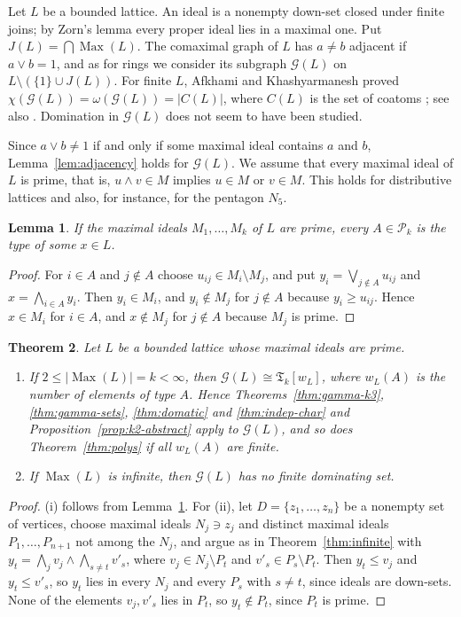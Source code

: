 \documentclass[11pt]{amsart}
\newtheorem{theorem}{Theorem}[section]
\newtheorem{lemma}[theorem]{Lemma}
\theoremstyle{definition}
\theoremstyle{remark}
\newcommand{\Max}{\operatorname{Max}}
\newcommand{\Jac}{J}
\newcommand{\G}{\mathcal{G}}
\newcommand{\TG}{\mathfrak{T}}
\newcommand{\Pk}{\mathcal{P}_k}
\begin{document}
Let $L$ be a bounded lattice. An ideal is a nonempty down-set closed under finite joins; by Zorn's
lemma every proper ideal lies in a maximal one. Put $\Jac(L)=\bigcap\Max(L)$. The comaximal graph of
$L$ \cite{AK14} has $a\neq b$ adjacent if $a\vee b=1$, and as for rings we consider its subgraph
$\G(L)$ on $L\setminus(\{1\}\cup\Jac(L))$. For finite $L$, Afkhami and Khashyarmanesh proved
$\chi(\G(L))=\omega(\G(L))=|C(L)|$, where $C(L)$ is the set of coatoms \cite[Theorem~3.4]{AK14};
see also \cite{AKS15}. Domination in $\G(L)$ does not seem to have been studied.

Since $a\vee b\neq1$ if and only if some maximal ideal contains $a$ and $b$,
Lemma~\ref{lem:adjacency} holds for $\G(L)$. We assume that every maximal ideal of $L$ is prime,
that is, $u\wedge v\in M$ implies $u\in M$ or $v\in M$. This holds for distributive lattices
\cite{Gr11} and also, for instance, for the pentagon $N_5$.

\begin{lemma}\label{lem:lattice-realization}
If the maximal ideals $M_1,\dots,M_k$ of $L$ are prime, every $A\in\Pk$ is the type of some
$x\in L$.
\end{lemma}

\begin{proof}
For $i\in A$ and $j\notin A$ choose $u_{ij}\in M_i\setminus M_j$, and put
$y_i=\bigvee_{j\notin A}u_{ij}$ and $x=\bigwedge_{i\in A}y_i$. Then $y_i\in M_i$, and $y_i\notin M_j$
for $j\notin A$ because $y_i\ge u_{ij}$. Hence $x\in M_i$ for $i\in A$, and $x\notin M_j$ for
$j\notin A$ because $M_j$ is prime.
\end{proof}

\begin{theorem}\label{thm:lattice}
Let $L$ be a bounded lattice whose maximal ideals are prime.
\begin{enumerate}[label=\textup{(\roman*)}]
\item If $2\le|\Max(L)|=k<\infty$, then $\G(L)\cong\TG_k[w_L]$, where $w_L(A)$ is the number of
  elements of type $A$. Hence Theorems~\ref{thm:gamma-k3}, \ref{thm:gamma-sets}, \ref{thm:domatic}
  and \ref{thm:indep-char} and Proposition~\ref{prop:k2-abstract} apply to $\G(L)$, and so does
  Theorem~\ref{thm:polys} if all $w_L(A)$ are finite.
\item If $\Max(L)$ is infinite, then $\G(L)$ has no finite dominating set.
\end{enumerate}
\end{theorem}

\begin{proof}
(i) follows from Lemma~\ref{lem:lattice-realization}. For (ii), let $D=\{z_1,\dots,z_n\}$ be a
nonempty set of vertices, choose maximal ideals $N_j\ni z_j$ and distinct maximal ideals
$P_1,\dots,P_{n+1}$ not among the $N_j$, and argue as in Theorem~\ref{thm:infinite} with
$y_t=\bigwedge_jv_j\wedge\bigwedge_{s\ne t}v'_s$, where $v_j\in N_j\setminus P_t$ and
$v'_s\in P_s\setminus P_t$. Then $y_t\le v_j$ and $y_t\le v'_s$, so $y_t$ lies in every $N_j$ and every $P_s$ with $s\neq t$,
since ideals are down-sets. None of the elements $v_j,v'_s$ lies in $P_t$, so $y_t\notin P_t$,
since $P_t$ is prime.
\end{proof}
\end{document}
